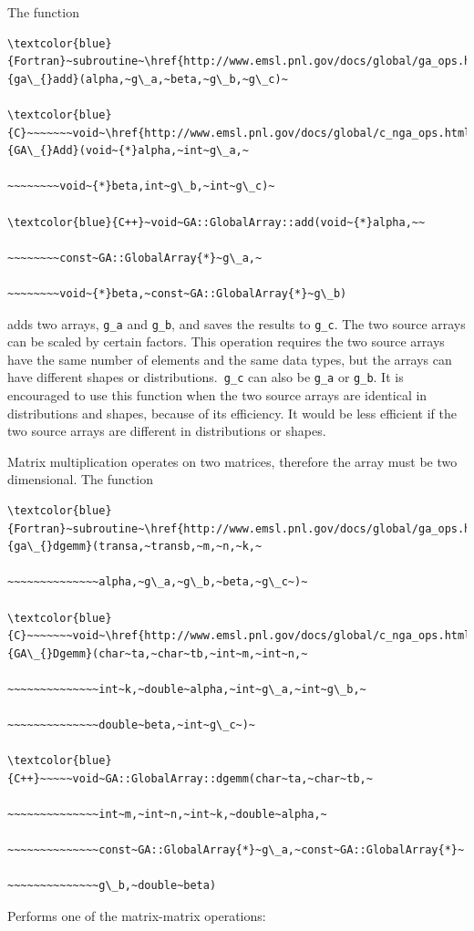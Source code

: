 The function
\begin{verbatim}
\textcolor{blue}{Fortran}~subroutine~\href{http://www.emsl.pnl.gov/docs/global/ga_ops.html\#ga_add}{ga\_{}add}(alpha,~g\_a,~beta,~g\_b,~g\_c)~

\textcolor{blue}{C}~~~~~~~void~\href{http://www.emsl.pnl.gov/docs/global/c_nga_ops.html\#ga_add}{GA\_{}Add}(void~{*}alpha,~int~g\_a,~

~~~~~~~~void~{*}beta,int~g\_b,~int~g\_c)~

\textcolor{blue}{C++}~void~GA::GlobalArray::add(void~{*}alpha,~~

~~~~~~~~const~GA::GlobalArray{*}~g\_a,~

~~~~~~~~void~{*}beta,~const~GA::GlobalArray{*}~g\_b)
\end{verbatim}
adds two arrays, \texttt{g\_a} and \texttt{g\_b}, and saves the results
to \texttt{g\_c}. The two source arrays can be scaled by certain factors.
This operation requires the two source arrays have the same number
of elements and the same data types, but the arrays can have different
shapes or distributions.\texttt{ g\_c} can also be \texttt{g\_a} or
\texttt{g\_b}. It is encouraged to use this function when the two
source arrays are identical in distributions and shapes, because of
its efficiency. It would be less efficient if the two source arrays
are different in distributions or shapes.

Matrix multiplication operates on two matrices, therefore the array
must be two dimensional. The function
\begin{verbatim}
\textcolor{blue}{Fortran}~subroutine~\href{http://www.emsl.pnl.gov/docs/global/ga_ops.html\#ga_dgemm}{ga\_{}dgemm}(transa,~transb,~m,~n,~k,~

~~~~~~~~~~~~~~alpha,~g\_a,~g\_b,~beta,~g\_c~)~

\textcolor{blue}{C}~~~~~~~void~\href{http://www.emsl.pnl.gov/docs/global/c_nga_ops.html\#ga_dgemm}{GA\_{}Dgemm}(char~ta,~char~tb,~int~m,~int~n,~

~~~~~~~~~~~~~~int~k,~double~alpha,~int~g\_a,~int~g\_b,~

~~~~~~~~~~~~~~double~beta,~int~g\_c~)~

\textcolor{blue}{C++}~~~~~void~GA::GlobalArray::dgemm(char~ta,~char~tb,~

~~~~~~~~~~~~~~int~m,~int~n,~int~k,~double~alpha,~

~~~~~~~~~~~~~~const~GA::GlobalArray{*}~g\_a,~const~GA::GlobalArray{*}~

~~~~~~~~~~~~~~g\_b,~double~beta)
\end{verbatim}
Performs one of the matrix-matrix operations:

